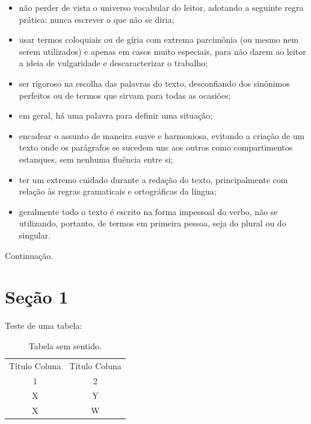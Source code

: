 \documentclass[
	12pt,				%
	openright,			%
	oneside,	
	a4paper,				%
	english,				%
	brazil				%
]{abntex2/abntex2} %
\begin{document}
\begin{itemize}
		\item não perder de vista o universo vocabular do leitor, adotando a seguinte
regra prática: nunca escrever o que não se diria;

		\item usar termos coloquiais ou de gíria com extrema parcimônia (ou mesmo
nem serem utilizados) e apenas em casos muito especiais, para não darem ao leitor a ideia de vulgaridade e descaracterizar o trabalho;

		\item ser rigoroso na escolha das palavras do texto, desconfiando dos
sinônimos perfeitos ou de termos que sirvam para todas as ocasiões;

		\item em geral, há uma palavra para definir uma situação;

		\item encadear o assunto de maneira suave e harmoniosa, evitando a
criação de um texto onde os parágrafos se sucedem uns aos outros
como compartimentos estanques, sem nenhuma fluência entre si;

		\item ter um extremo cuidado durante a redação do texto, principalmente
com relação às regras gramaticais e ortográficas da língua;

		\item geralmente todo o texto é escrito na forma impessoal do verbo, não se utilizando,
portanto, de termos em primeira pessoa, seja do plural ou do singular.

	\end{itemize}

	Continuação.
	
	\section{Seção 1}
	
		Teste de uma tabela:

		\begin{table}[htbp]
			\caption{Tabela sem sentido.}
			\label{tabela-ssentido}
			\begin{center}
			\begin{tabular}{|c|c|}
				\hline
				Título Coluna & Título Coluna \\
				1 & 2 \\
				\hline
				X & Y \\
				\hline
				X & W \\
				\hline
			\end{tabular}
			\end{center}
		\end{table}
		
\end{document}
